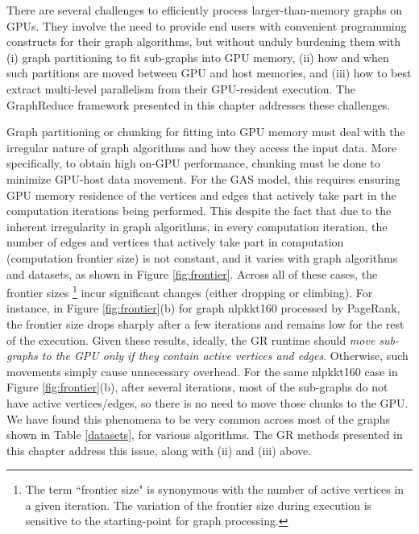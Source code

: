 There are several challenges to efficiently process larger-than-memory graphs on GPUs. They involve the need to provide end
users with convenient programming constructs for their graph algorithms, but without unduly burdening them with (i) graph partitioning to
fit sub-graphs into GPU memory, (ii) how and when such partitions are moved between GPU and host memories, and (iii) how to best
extract multi-level parallelism from their GPU-resident execution. The GraphReduce framework presented in this chapter 
addresses these challenges.




Graph partitioning or chunking for fitting into GPU memory must deal with the irregular nature of 
graph algorithms and how they access the input data. More specifically, to obtain high on-GPU performance, chunking
must be done to minimize GPU-host data movement. For the GAS model, this requires ensuring GPU memory residence of 
the vertices and edges that actively take part in the computation iterations being performed.
This despite the fact that due to the inherent irregularity in graph algorithms, in every computation iteration, the number 
of edges and vertices that actively take part in computation (computation frontier size) is not constant, and it varies with 
graph algorithms and datasets, as shown in Figure \ref{fig:frontier}. Across all of these cases, the frontier sizes \footnote{\scriptsize The term ``frontier size" is synonymous with the number of active vertices in a given iteration. The variation of the frontier size during execution is sensitive to the starting-point for graph processing. } 
incur significant changes (either dropping or climbing). For instance, in Figure \ref{fig:frontier}(b) for graph nlpkkt160 processed 
by PageRank, the frontier size drops sharply after a few iterations and remains low for the rest of the execution. 
Given these results, ideally, the GR runtime should {\em move sub-graphs to the GPU only if they
contain active vertices and edges}. Otherwise, such movements simply cause unnecessary overhead.
For the same nlpkkt160 case in Figure \ref{fig:frontier}(b), after several iterations, most of the sub-graphs do not have 
active vertices/edges, so there is no need to move those chunks to the GPU. We have found this phenomena to be very common 
across most of the graphs shown in Table \ref{datasets}, for various algorithms. The GR methods presented in this chapter address this issue, along with (ii) and (iii) above.

